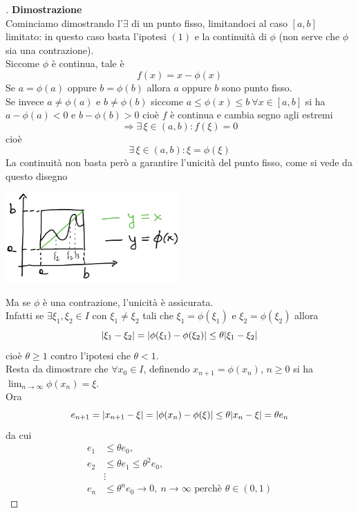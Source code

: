 \documentclass[12pt]{article}
\DeclarePairedDelimiter{\abs}{\lvert}{\rvert}
\begin{document}
\begin{proof}[\unskip\nopunct]
\textbf{Dimostrazione}\\
Cominciamo dimostrando l'$\exists$ di un punto fisso, limitandoci al caso $[a,b]$ limitato: in questo caso basta l'ipotesi $(1)$ e la continuità di $\phi$ (non serve che $\phi$ sia una contrazione). \\
Siccome $\phi$ è continua, tale è 
\[ f(x) = x - \phi(x) \]
Se $a = \phi(a)$ oppure $b = \phi(b)$ allora $a$ oppure $b$ sono punto fisso.\\
Se invece $a \neq \phi(a)$ e $b \neq \phi(b)$ siccome $a \leq \phi(x) \leq b \ \forall x \in [a,b]$ si ha $a - \phi(a) < 0$ e $b - \phi(b) > 0$ cioè $f$ è continua e cambia segno agli estremi 
\[\Longrightarrow \exists\, \xi \in (a,b):f(\xi)=0\] 
cioè \[\exists\, \xi \in (a,b) : \xi = \phi(\xi)\]
La continuità non basta però a garantire l'unicità del punto fisso, come si vede da questo disegno
\begin{center}
    \includegraphics[width=0.5\textwidth]{img1_pag7.png}
\end{center}
Ma se $\phi$ è una contrazione, l'unicità è assicurata. \\
Infatti se $\exists \xi_1, \xi_2 \in I$ con $\xi_1 \neq \xi_2$ tali che $\xi_1 = \phi(\xi_1)$ e $\xi_2 = \phi(\xi_2)$ allora 
\[\abs{\xi_1 - \xi_2} = \abs{\phi(\xi_1) - \phi(\xi_2)} \leq \theta\abs{\xi_1 - \xi_2}\] 
cioè $\theta \geq 1$ contro l'ipotesi che $\theta < 1$. \\
Resta da dimostrare che $\forall x_0 \in I$, definendo $x_{n+1} = \phi(x_n)$, $n \geq 0$ si ha $\lim_{n\to\infty} \phi(x_n) = \xi$. \\
Ora 
\[e_{n+1} = \abs{x_{n+1} - \xi} = \abs{\phi(x_n) - \phi(\xi)} \leq \theta\abs{x_n - \xi} = \theta e_n\]
da cui 
\[\begin{split}
    e_1 & \leq \theta e_0,\\
    e_2 & \leq \theta e_1 \leq \theta^2 e_0, \\
    & \vdots \\
    e_n & \leq \theta^n e_0 \to 0, \ n\to\infty \text{ perchè } \theta \in (0,1)
\end{split}\]
\end{proof}
\end{document}
